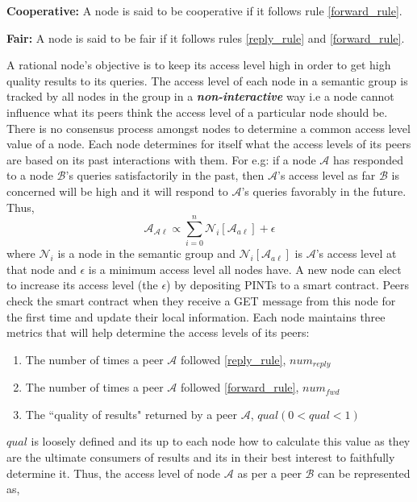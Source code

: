 \begin{definition}{\textbf{Cooperative:}}
	A node is said to be cooperative if it follows rule \ref{forward_rule}.
\end{definition}
\begin{definition}{\textbf{Fair:}}
	A node is said to be fair if it follows rules \ref{reply_rule} and \ref{forward_rule}.
\end{definition}
A rational node's objective is to keep its access level high in order to get high quality results to its queries. The access level of each node in a semantic group is tracked by all nodes in the group in a \textit{\textbf{non-interactive}} way i.e a node cannot influence what its peers think the access level of a particular node should be. There is no consensus process amongst nodes to determine a common access level value of a node. Each node determines for itself what the access levels of its peers are based on its past interactions with them. For e.g: if a node $\mathcal{A}$ has responded to a node $\mathcal{B}$'s queries satisfactorily in the past, then $\mathcal{A}$'s access level as far $\mathcal{B}$ is concerned will be high and it will respond to $\mathcal{A}$'s queries favorably in the future. Thus,
\newline
$$ \mathcal{A}_{\mathcal{A}\ell} \propto \sum_{i=0}^{n} \mathcal{N}_i[\mathcal{A}_{a\ell}] + \epsilon$$ 
where $\mathcal{N}_i$ is a node in the semantic group and $\mathcal{N}_i[\mathcal{A}_{a\ell}]$ is $\mathcal{A}$'s access level at that node and $\epsilon$ is a minimum access level all nodes have.
\newline
A new node can elect to increase its access level (the $\epsilon$) by depositing PINTs to a smart contract. Peers check the smart contract when they receive a GET message from this node for the first time and update their local information. Each node maintains three metrics that will help determine the access levels of its peers:
\begin{enumerate}
	\item The number of times a peer $\mathcal{A}$ followed \ref{reply_rule}, $num_{reply}$
	\item The number of times a peer $\mathcal{A}$ followed \ref{forward_rule}, $num_{fwd}$
	\item The ``quality of results" returned by a peer $\mathcal{A}$, $qual (0 < qual < 1)$
\end{enumerate}
$qual$ is loosely defined and its up to each node how to calculate this value as they are the ultimate consumers of results and its in their best interest to faithfully determine it. Thus, the access level of node $\mathcal{A}$ as per a peer $\mathcal{B}$ can be represented as,
